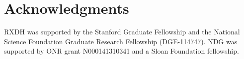 \documentclass[10pt,letterpaper]{article}
\begin{document}
\section{\bf Acknowledgments}
\small
RXDH was supported by the Stanford Graduate Fellowship and the National Science Foundation Graduate Research Fellowship (DGE-114747). NDG was supported by ONR grant N000141310341 and a Sloan Foundation fellowship.

\vspace{1em}
\vspace{1em} \noindent 



\setlength{\bibleftmargin}{.125in}
\setlength{\bibindent}{-\bibleftmargin}


\end{document}
